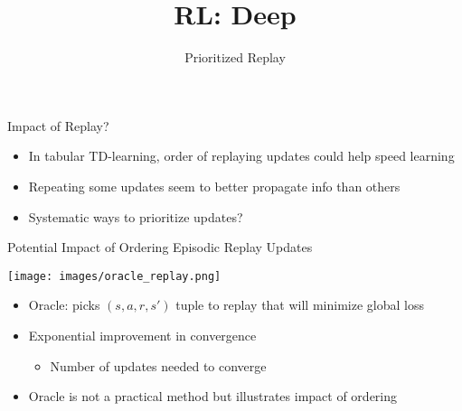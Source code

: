 \documentclass[aspectratio=169]{../latex_main/tntbeamer}  %
\title[RL: Deep Reinforcement Learning]{RL: Deep}
\subtitle{Prioritized Replay}
\begin{document}
	
	\maketitle

\begin{frame}[c]{Impact of Replay?}
	

\begin{itemize}
	\item In tabular TD-learning, \alert{order} of replaying updates could help speed
	learning
	\item Repeating some updates seem to better propagate info than others
	\item Systematic ways to prioritize updates?
\end{itemize}
	
\end{frame}
\begin{frame}[c]{Potential Impact of Ordering Episodic Replay Updates~}
	
	\texttt{[image: images/oracle\_replay.png]}
	
	\begin{itemize}
		\item Oracle: picks $(s, a, r , s' )$ tuple to replay that will minimize global loss
		\item Exponential improvement in convergence
		\begin{itemize}
			\item 		Number of updates needed to converge
		\end{itemize}
		\item Oracle is not a practical method but illustrates impact of ordering
	\end{itemize}
	
\end{frame}
\end{document}

